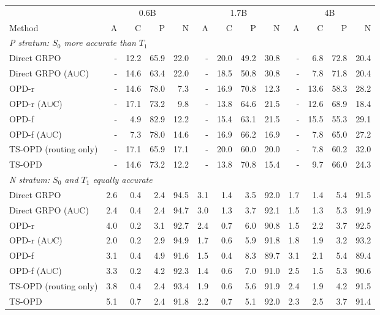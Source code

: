 \begin{tabular}{lrrrrrrrrrrrr}
\toprule
 & \multicolumn{4}{c}{0.6B} & \multicolumn{4}{c}{1.7B} & \multicolumn{4}{c}{4B} \\
\cmidrule(lr){2-5}\cmidrule(lr){6-9}\cmidrule(lr){10-13}
Method & A & C & P & N & A & C & P & N & A & C & P & N \\
\midrule
\multicolumn{13}{l}{\textit{P stratum: $S_0$ more accurate than $T_1$}} \\
Direct GRPO & - & 12.2 & 65.9 & 22.0 & - & 20.0 & 49.2 & 30.8 & - & 6.8 & 72.8 & 20.4 \\
Direct GRPO (A$\cup$C) & - & 14.6 & 63.4 & 22.0 & - & 18.5 & 50.8 & 30.8 & - & 7.8 & 71.8 & 20.4 \\
OPD-r & - & 14.6 & 78.0 & 7.3 & - & 16.9 & 70.8 & 12.3 & - & 13.6 & 58.3 & 28.2 \\
OPD-r (A$\cup$C) & - & 17.1 & 73.2 & 9.8 & - & 13.8 & 64.6 & 21.5 & - & 12.6 & 68.9 & 18.4 \\
OPD-f & - & 4.9 & 82.9 & 12.2 & - & 15.4 & 63.1 & 21.5 & - & 15.5 & 55.3 & 29.1 \\
OPD-f (A$\cup$C) & - & 7.3 & 78.0 & 14.6 & - & 16.9 & 66.2 & 16.9 & - & 7.8 & 65.0 & 27.2 \\
TS-OPD (routing only) & - & 17.1 & 65.9 & 17.1 & - & 20.0 & 60.0 & 20.0 & - & 7.8 & 60.2 & 32.0 \\
TS-OPD & - & 14.6 & 73.2 & 12.2 & - & 13.8 & 70.8 & 15.4 & - & 9.7 & 66.0 & 24.3 \\
\midrule
\multicolumn{13}{l}{\textit{N stratum: $S_0$ and $T_1$ equally accurate}} \\
Direct GRPO & 2.6 & 0.4 & 2.4 & 94.5 & 3.1 & 1.4 & 3.5 & 92.0 & 1.7 & 1.4 & 5.4 & 91.5 \\
Direct GRPO (A$\cup$C) & 2.4 & 0.4 & 2.4 & 94.7 & 3.0 & 1.3 & 3.7 & 92.1 & 1.5 & 1.3 & 5.3 & 91.9 \\
OPD-r & 4.0 & 0.2 & 3.1 & 92.7 & 2.4 & 0.7 & 6.0 & 90.8 & 1.5 & 2.2 & 3.7 & 92.5 \\
OPD-r (A$\cup$C) & 2.0 & 0.2 & 2.9 & 94.9 & 1.7 & 0.6 & 5.9 & 91.8 & 1.8 & 1.9 & 3.2 & 93.2 \\
OPD-f & 3.1 & 0.4 & 4.9 & 91.6 & 1.5 & 0.4 & 8.3 & 89.7 & 3.1 & 2.1 & 5.4 & 89.4 \\
OPD-f (A$\cup$C) & 3.3 & 0.2 & 4.2 & 92.3 & 1.4 & 0.6 & 7.0 & 91.0 & 2.5 & 1.5 & 5.3 & 90.6 \\
TS-OPD (routing only) & 3.8 & 0.4 & 2.4 & 93.4 & 1.9 & 0.6 & 5.6 & 91.9 & 2.4 & 1.9 & 4.2 & 91.5 \\
TS-OPD & 5.1 & 0.7 & 2.4 & 91.8 & 2.2 & 0.7 & 5.1 & 92.0 & 2.3 & 2.5 & 3.7 & 91.4 \\
\bottomrule
\end{tabular}
